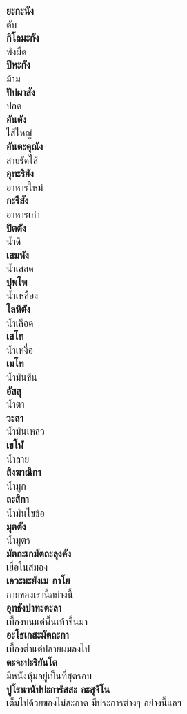 \documentclass[12pt]{article}
\begin{document}
\textbf{ยะกะนัง} \\
\indent ตับ\\
\textbf{กิโลมะกัง} \\
\indent พังผืด\\
\textbf{ปิหะกัง} \\
\indent ม้าม\\
\textbf{ปัปผาสัง} \\
\indent ปอด\\
\textbf{อันตัง} \\
\indent ไส้ใหญ่\\
\textbf{อันตะคุณัง} \\
\indent สายรัดไส้\\
\textbf{อุทะริยัง} \\
\indent อาหารใหม่\\
\textbf{กะรีสัง} \\
\indent อาหารเก่า\\
\textbf{ปิตตัง} \\
\indent น้ำดี\\
\textbf{เสมหัง} \\
\indent น้ำเสลด\\
\textbf{ปุพโพ} \\
\indent น้ำเหลือง\\
\textbf{โลหิตัง} \\
\indent น้ำเลือด\\
\textbf{เสโท} \\
\indent น้ำเหงื่อ\\
\textbf{เมโท} \\
\indent น้ำมันข้น\\
\textbf{อัสสุ} \\
\indent น้ำตา\\
\textbf{วะสา} \\
\indent น้ำมันเหลว\\
\textbf{เขโฬ} \\
\indent น้ำลาย\\
\textbf{สิงฆาณิกา} \\
\indent น้ำมูก\\
\textbf{ละสิกา} \\
\indent น้ำมันไขข้อ\\
\textbf{มุตตัง} \\
\indent น้ำมูตร\\
\textbf{มัตถะเกมัตถะลุงคัง} \\
\indent เยื่อในสมอง\\
\textbf{เอวะมะยังเม กาโย} \\
\indent กายของเรานี้อย่างนี้\\
\textbf{อุทธังปาทะตะลา} \\
\indent เบื้องบนแต่พื้นเท้าขึ้นมา\\
\textbf{อะโธเกสะมัตถะกา}\\
\indent เบื้องต่ำแต่ปลายผมลงไป\\
\textbf{ตะจะปะริยันโต} \\
\indent มีหนังหุ้มอยู่เป็นที่สุดรอบ\\
\textbf{ปูโรนานัปปะการัสสะ อะสุจิโน}\\
\indent เต็มไปด้วยของไม่สะอาด มีประการต่างๆ อย่างนี้แลฯ\\
\end{document}
